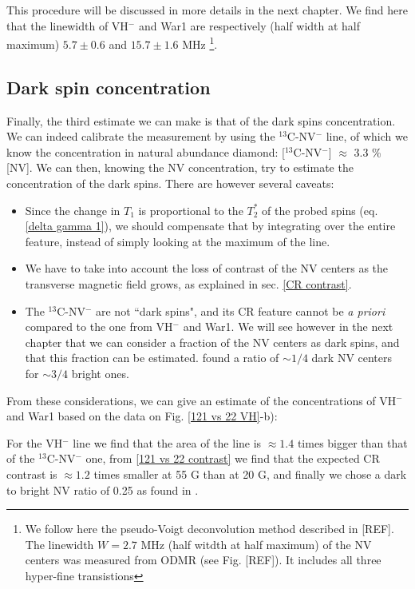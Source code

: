 \documentclass[a4paper, 11pt]{book}
\begin{document}
This procedure will be discussed in more details in the next chapter. We find here that the linewidth of VH$^-$ and War1 are respectively (half width at half maximum) $5.7\pm 0.6$ and $15.7\pm 1.6$ MHz \footnote{We follow here the pseudo-Voigt deconvolution method described in [REF]. The linewidth $W=2.7$ MHz (half witdth at half maximum) of the NV centers was measured from ODMR (see Fig. [REF]). It includes all three hyper-fine transistions}.

\subsection{Dark spin concentration}

Finally, the third estimate we can make is that of the dark spins concentration. We can indeed calibrate the measurement by using the $^{13}$C-NV$^-$ line, of which we know the concentration in natural abundance diamond: [$^{13}$C-NV$^-$] $\approx$ 3.3 \% [NV]. We can then, knowing the NV concentration, try to estimate the concentration of the dark spins. There are however several caveats:

\begin{itemize}
\item Since the change in $T_1$ is proportional to the $T_2^*$ of the probed spins (eq. \ref{delta gamma 1}), we should compensate that by integrating over the entire feature, instead of simply looking at the maximum of the line.
\item We have to take into account the loss of contrast of the NV centers as the transverse magnetic field grows, as explained in sec. \ref{CR contrast}.
\item The $^{13}$C-NV$^-$ are not ``dark spins", and its CR feature cannot be \textit{a priori} compared to the one from VH$^-$ and War1. We will see however in the next chapter that we can consider a fraction of the NV centers as dark spins, and that this fraction can be estimated. \citep{choi2017depolarization} found a ratio of $\sim 1/4$ dark NV centers for $\sim 3/4$ bright ones.
\end{itemize}

From these considerations, we can give an estimate of the concentrations of VH$^-$ and War1 based on the data on Fig. \ref{121 vs 22 VH}-b): 

For the VH$^-$ line we find that the area of the line is $\approx 1.4$ times bigger than that of the $^{13}$C-NV$^-$ one, from \ref{121 vs 22 contrast} we find that the expected CR contrast is $\approx 1.2$ times smaller at 55 G than at 20 G, and finally we chose a dark to bright NV ratio of 0.25 as found in \citep{choi2017depolarization}.
\end{document}
